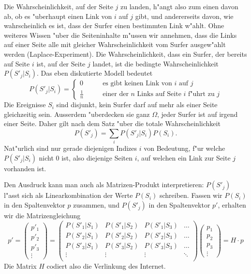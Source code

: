 Die Wahrscheinlichkeit, auf der Seite $j$ zu landen,
h"angt also zum einen davon ab, ob es "uberhaupt
einen Link von $i$ auf $j$ gibt, und andererseits davon, wie wahrscheinlich
es ist, dass der Surfer einen bestimmten Link w"ahlt.
Ohne weiteres Wissen "uber die Seiteninhalte m"ussen wir
annehmen, dass die Links auf einer Seite alle mit gleicher Wahrscheinlichkeit
vom Surfer ausgew"ahlt werden (Laplace-Experiment).
Die Wahrscheinlichkeit, dass ein Surfer, der bereits
auf Seite $i$ ist, auf der Seite $j$ landet, ist die bedingte Wahrscheinlichkeit
$P(S'_j|S_i)$. Das eben diskutierte Modell bedeutet
\[
P(S'_j|S_i)=\begin{cases}
0&\qquad\text{es gibt keinen Link von $i$ auf $j$}\\
\frac1n&\qquad\text{einer der $n$ Links auf Seite $i$ f"uhrt zu $j$}
\end{cases}
\]
Die Ereignisse $S_i$ sind disjunkt, kein Surfer darf auf mehr als einer
Seite gleichzeitig sein.
Ausserdem "uberdecken sie ganz $\Omega$, jeder Surfer ist auf irgend einer
Seite.
Daher gilt nach dem Satz "uber die totale Wahrscheinlichkeit
\[
P(S'_j)=\sum_{i}P(S'_j|S_i)P(S_i).
\]
Nat"urlich sind nur gerade diejenigen Indizes $i$ von Bedeutung, f"ur welche $P(S'_j|S_i)$
nicht $0$ ist, also diejenige Seiten $i$, auf welchen ein Link zur Seite $j$
vorhanden ist.

Den Ausdruck kann man auch als Matrizen-Produkt interpretieren: $P(S'_j)$ l"asst sich
als Linearkombination der Werte $P(S_i)$ schreiben. Fassen wir $P(S_i)$ in den Spaltenvektor
$p$ zusammen, und $P(S'_j)$ in den Spaltenvektor $p'$, erhalten wir die Matrizengleichung
\[
p'=
\left(\begin{matrix}p'_1\\p'_2\\p'_3\\\vdots\end{matrix}\right)
=
\left(\begin{matrix}
P(S'_1|S_1)&P(S'_1|S_2)&P(S'_1|S_3)&\dots\\
P(S'_2|S_1)&P(S'_2|S_2)&P(S'_2|S_3)&\dots\\
P(S'_3|S_1)&P(S'_3|S_2)&P(S'_3|S_3)&\dots\\
\vdots&\vdots&\vdots&\ddots\\
\end{matrix}\right)
\left(\begin{matrix}p_1\\p_2\\p_3\\\vdots\end{matrix}\right)
=
H\cdot p
\]
Die Matrix $H$ codiert also die Verlinkung des Internet.


